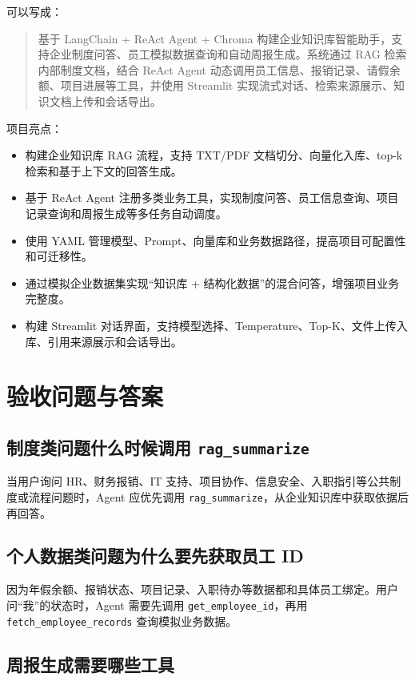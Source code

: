 \documentclass[UTF8,zihao=-4]{ctexart}
\begin{document}
可以写成：

\begin{quote}
基于 LangChain + ReAct Agent + Chroma 构建企业知识库智能助手，支持企业制度问答、员工模拟数据查询和自动周报生成。系统通过 RAG 检索内部制度文档，结合 ReAct Agent 动态调用员工信息、报销记录、请假余额、项目进展等工具，并使用 Streamlit 实现流式对话、检索来源展示、知识文档上传和会话导出。
\end{quote}

项目亮点：

\begin{itemize}
\item 构建企业知识库 RAG 流程，支持 TXT/PDF 文档切分、向量化入库、top-k 检索和基于上下文的回答生成。
\item 基于 ReAct Agent 注册多类业务工具，实现制度问答、员工信息查询、项目记录查询和周报生成等多任务自动调度。
\item 使用 YAML 管理模型、Prompt、向量库和业务数据路径，提高项目可配置性和可迁移性。
\item 通过模拟企业数据集实现“知识库 + 结构化数据”的混合问答，增强项目业务完整度。
\item 构建 Streamlit 对话界面，支持模型选择、Temperature、Top-K、文件上传入库、引用来源展示和会话导出。
\end{itemize}

\section{验收问题与答案}

\subsection{制度类问题什么时候调用 \texttt{rag\_summarize}}

当用户询问 HR、财务报销、IT 支持、项目协作、信息安全、入职指引等公共制度或流程问题时，Agent 应优先调用 \texttt{rag\_summarize}，从企业知识库中获取依据后再回答。

\subsection{个人数据类问题为什么要先获取员工 ID}

因为年假余额、报销状态、项目记录、入职待办等数据都和具体员工绑定。用户问“我”的状态时，Agent 需要先调用 \texttt{get\_employee\_id}，再用 \texttt{fetch\_employee\_records} 查询模拟业务数据。

\subsection{周报生成需要哪些工具}
\end{document}
